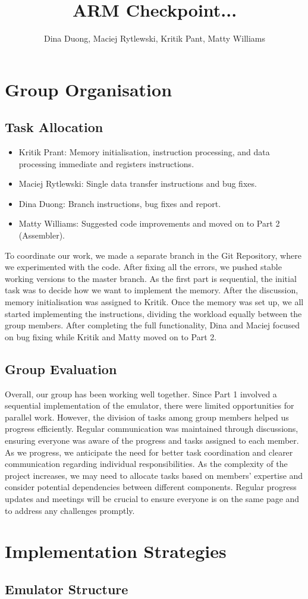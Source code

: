 \documentclass[11pt]{article}
\begin{document}
\title{ARM Checkpoint... }
\author{Dina Duong, Maciej Rytlewski, Kritik Pant, Matty Williams}

\maketitle

\section{Group Organisation}

\subsection*{Task Allocation}

\begin{itemize}
    \item Kritik Prant: Memory initialisation, instruction processing, and data processing immediate and registers instructions.
    \item Maciej Rytlewski: Single data transfer instructions and bug fixes.
    \item Dina Duong: Branch instructions, bug fixes and report. 
    \item Matty Williams: Suggested code improvements and moved on to Part 2 (Assembler).
\end{itemize}
To coordinate our work, we made a separate branch in the Git Repository, where we experimented with the code. 
After fixing all the errors, we pushed stable working versions to the master branch. 
As the first part is sequential, the initial task was to decide how we want to implement the memory. 
After the discussion, memory initialisation was assigned to Kritik. Once the memory was set up, we all started 
implementing the instructions, dividing the workload equally between the group members. 
After completing the full functionality, Dina and Maciej focused on bug fixing while Kritik and Matty moved on to Part 2.

\subsection*{Group Evaluation}
Overall, our group has been working well together. Since Part 1 involved a sequential implementation of the emulator, 
there were limited opportunities for parallel work. However, the division of tasks among group members helped us progress efficiently.
Regular communication was maintained through discussions, ensuring everyone was aware of the progress and tasks assigned to each member.
\newline
As we progress, we anticipate the need for better task coordination and clearer communication regarding individual responsibilities. 
As the complexity of the project increases, we may need to allocate tasks based on members' expertise and consider potential 
dependencies between different components. Regular progress updates and meetings will be crucial to ensure 
everyone is on the same page and to address any challenges promptly.

\section{Implementation Strategies}

\subsection*{Emulator Structure}
\end{document}
